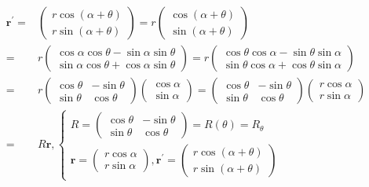 \documentclass[
]{book}
\theoremstyle{definition}
\theoremstyle{definition}
\theoremstyle{definition}
\theoremstyle{definition}
\theoremstyle{remark}
\begin{document}
\[
\begin{aligned}
\boldsymbol{r}^{\prime}= & \begin{pmatrix}r\cos\left(\alpha+\theta\right)\\
r\sin\left(\alpha+\theta\right)
\end{pmatrix}=r\begin{pmatrix}\cos\left(\alpha+\theta\right)\\
\sin\left(\alpha+\theta\right)
\end{pmatrix}\\
= & r\begin{pmatrix}\cos\alpha\cos\theta-\sin\alpha\sin\theta\\
\sin\alpha\cos\theta+\cos\alpha\sin\theta
\end{pmatrix}=r\begin{pmatrix}\cos\theta\cos\alpha-\sin\theta\sin\alpha\\
\sin\theta\cos\alpha+\cos\theta\sin\alpha
\end{pmatrix}\\
= & r\begin{pmatrix}\cos\theta & -\sin\theta\\
\sin\theta & \cos\theta
\end{pmatrix}\begin{pmatrix}\cos\alpha\\
\sin\alpha
\end{pmatrix}=\begin{pmatrix}\cos\theta & -\sin\theta\\
\sin\theta & \cos\theta
\end{pmatrix}\begin{pmatrix}r\cos\alpha\\
r\sin\alpha
\end{pmatrix}\\
= & R\boldsymbol{r},\begin{cases}
R=\begin{pmatrix}\cos\theta & -\sin\theta\\
\sin\theta & \cos\theta
\end{pmatrix}=R\left(\theta\right)=R_{{\scriptscriptstyle \theta}}\\
\boldsymbol{r}=\begin{pmatrix}r\cos\alpha\\
r\sin\alpha
\end{pmatrix},\boldsymbol{r}^{\prime}=\begin{pmatrix}r\cos\left(\alpha+\theta\right)\\
r\sin\left(\alpha+\theta\right)
\end{pmatrix}
\end{cases}
\end{aligned}
\]
\end{document}

